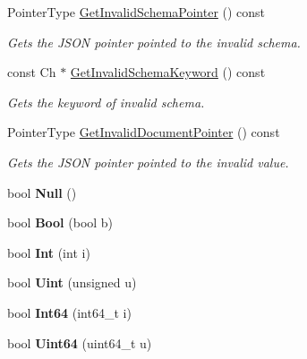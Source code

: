 \begin{DoxyCompactItemize}
\mbox{\label{a02244_a5b8f2d5c466b2a362e2e4c3bcfbfc5a8}} 
Pointer\+Type \hyperlink{a02244_a5b8f2d5c466b2a362e2e4c3bcfbfc5a8}{Get\+Invalid\+Schema\+Pointer} () const
\begin{DoxyCompactList}\small\item\em Gets the J\+S\+ON pointer pointed to the invalid schema. \end{DoxyCompactList}\item 
\mbox{\label{a02244_ab71ec18e5a013e5153a10b312a4f03bc}} 
const Ch $\ast$ \hyperlink{a02244_ab71ec18e5a013e5153a10b312a4f03bc}{Get\+Invalid\+Schema\+Keyword} () const
\begin{DoxyCompactList}\small\item\em Gets the keyword of invalid schema. \end{DoxyCompactList}\item 
\mbox{\label{a02244_ac10a88c4dc138bbdbe2afd041658a3b0}} 
Pointer\+Type \hyperlink{a02244_ac10a88c4dc138bbdbe2afd041658a3b0}{Get\+Invalid\+Document\+Pointer} () const
\begin{DoxyCompactList}\small\item\em Gets the J\+S\+ON pointer pointed to the invalid value. \end{DoxyCompactList}\item 
\mbox{\label{a02244_a7137af73e934f50c66cbb8a9aa802ea6}} 
bool {\bfseries Null} ()
\item 
\mbox{\label{a02244_aa25fa7456f2f308a105e400f01a4afde}} 
bool {\bfseries Bool} (bool b)
\item 
\mbox{\label{a02244_ad823c29990225661a4df69d34647b659}} 
bool {\bfseries Int} (int i)
\item 
\mbox{\label{a02244_aa688665c5274f93543c84a4b6cabe8da}} 
bool {\bfseries Uint} (unsigned u)
\item 
\mbox{\label{a02244_ac5a9e416e18129a7b787f251019a828f}} 
bool {\bfseries Int64} (int64\+\_\+t i)
\item 
\mbox{\label{a02244_abfc56c58cf0b65318e376fc5f2879292}} 
bool {\bfseries Uint64} (uint64\+\_\+t u)
\item 

\end{DoxyCompactItemize}

